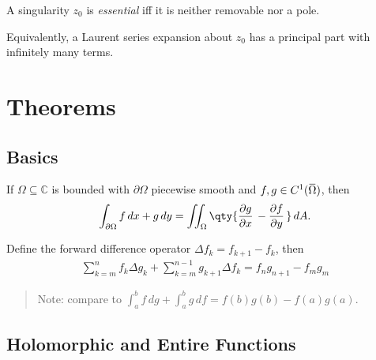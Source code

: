 \begin{definition}

A singularity \(z_0\) is \emph{essential} iff it is neither removable
nor a pole.

Equivalently, a Laurent series expansion about \(z_0\) has a principal
part with infinitely many terms.

\end{definition}

\hypertarget{theorems}{%
\section{Theorems}\label{theorems}}

\hypertarget{basics}{%
\subsection{Basics}\label{basics}}

\begin{theorem}

If \(\Omega \subseteq {\mathbb{C}}\) is bounded with
\({{\partial}}\Omega\) piecewise smooth and
\(f, g\in C^1(\mkern 1.5mu\overline{\mkern-1.5mu\Omega\mkern-1.5mu}\mkern 1.5mu)\),
then
\begin{align*}\int_{{{\partial}}\Omega} f\, dx + g\, dy = \iint_{\Omega} \qty{ {\frac{\partial g}{\partial x}\,} - {\frac{\partial f}{\partial y}\,} } \, dA.\end{align*}

\end{theorem}

\begin{theorem}

Define the forward difference operator \(\Delta f_k = f_{k+1} - f_k\),
then
\begin{align*}
\sum_{k=m}^n f_k \Delta g_k  + \sum_{k=m}^{n-1} g_{k+1}\Delta f_k = f_n g_{n+1} - f_m g_m
\end{align*}

\begin{quote}
Note: compare to
\(\int_a^b f \, dg + \int_a^b g\, df = f(b) g(b) - f(a) g(a)\).
\end{quote}

\end{theorem}

\hypertarget{holomorphic-and-entire-functions}{%
\subsection{Holomorphic and Entire
Functions}\label{holomorphic-and-entire-functions}}


